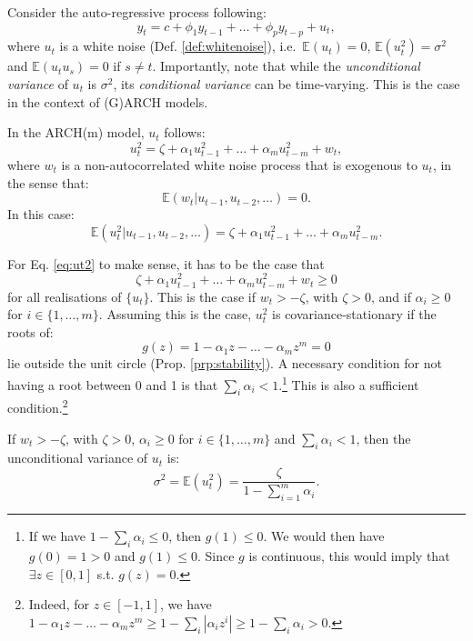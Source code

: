 \documentclass[
  11pt,
]{book}
\theoremstyle{definition}
\theoremstyle{definition}
\theoremstyle{definition}
\theoremstyle{definition}
\theoremstyle{remark}
\begin{document}
Consider the auto-regressive process following:
\begin{equation}
y_t = c + \phi_1 y_{t-1} + \dots + \phi_p y_{t-p} + u_t,\label{eq:linearreg}
\end{equation}
where \(u_t\) is a white noise (Def. \ref{def:whitenoise}), i.e.~\(\mathbb{E}(u_t)=0\), \(\mathbb{E}(u_t^2)=\sigma^2\) and \(\mathbb{E}(u_t u_s)=0\) if \(s \ne t\). Importantly, note that while the \emph{unconditional variance} of \(u_t\) is \(\sigma^2\), its \emph{conditional variance} can be time-varying. This is the case in the context of (G)ARCH models.

In the ARCH(m) model, \(u_t\) follows:
\begin{equation}
u_t^2 = \zeta + \alpha_1 u_{t-1}^2 + \dots + \alpha_m u_{t-m}^2 + w_t,\label{eq:ut2}
\end{equation}
where \(w_t\) is a non-autocorrelated white noise process that is exogenous to \(u_t\), in the sense that:
\[
\mathbb{E}(w_t|u_{t-1},u_{t-2},\dots)=0.
\]
In this case:
\begin{equation}
\mathbb{E}(u_t^2|u_{t-1},u_{t-2},\dots) = \zeta + \alpha_1 u_{t-1}^2 + \dots + \alpha_m u_{t-m}^2.\label{eq:condvar}
\end{equation}

For Eq. \eqref{eq:ut2} to make sense, it has to be the case that
\[
\zeta + \alpha_1 u_{t-1}^2 + \dots + \alpha_m u_{t-m}^2 + w_t \ge 0
\]
for all realisations of \(\{u_t\}\). This is the case if \(w_t > -\zeta\), with \(\zeta>0\), and if \(\alpha_i \ge 0\) for \(i \in \{1,\dots,m\}\). Assuming this is the case, \(u_t^2\) is covariance-stationary if the roots of:
\[
g(z) = 1 - \alpha_1 z - \dots - \alpha_m z^m = 0
\]
lie outside the unit circle (Prop. \ref{prp:stability}). A necessary condition for not having a root between 0 and 1 is that \(\sum_i \alpha_i<1\).\footnote{If we have \(1-\sum_i \alpha_i \le 0\), then \(g(1) \le 0\). We would then have \(g(0)=1>0\) and \(g(1)\le 0\). Since \(g\) is continuous, this would imply that \(\exists z \in [0,1]\) s.t. \(g(z)=0\).} This is also a sufficient condition.\footnote{Indeed, for \(z \in [-1,1]\), we have \(1 - \alpha_1 z - \dots - \alpha_m z^m \ge 1 - \sum_i |\alpha_iz^i| \ge 1 - \sum_i \alpha_i > 0\).}

If \(w_t > -\zeta\), with \(\zeta>0\), \(\alpha_i\ge0\) for \(i \in \{1,\dots,m\}\) and \(\sum_i \alpha_i<1\), then the unconditional variance of \(u_t\) is:
\[
\sigma^2 = \mathbb{E}(u_t^2) = \frac{\zeta}{1 - \sum_{i=1}^m \alpha_i}.
\]
\end{document}

